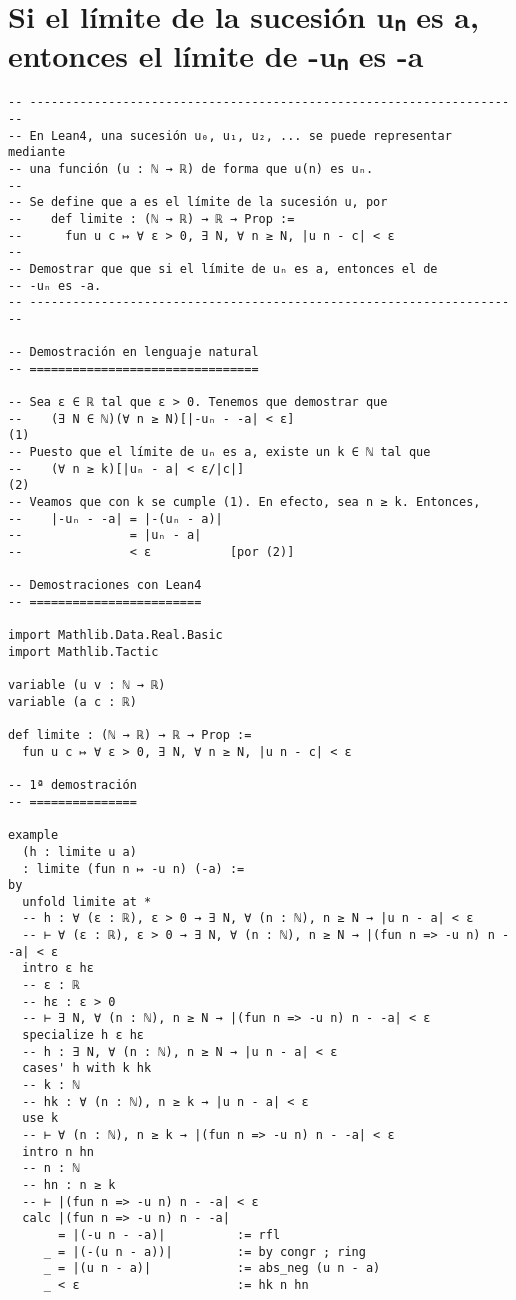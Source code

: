 \section{Si el límite de la sucesión uₙ es a, entonces el límite de -uₙ es -a}
\label{sec:orge0c8ccc}
\begin{verbatim}
-- ---------------------------------------------------------------------
-- En Lean4, una sucesión u₀, u₁, u₂, ... se puede representar mediante
-- una función (u : ℕ → ℝ) de forma que u(n) es uₙ.
--
-- Se define que a es el límite de la sucesión u, por
--    def limite : (ℕ → ℝ) → ℝ → Prop :=
--      fun u c ↦ ∀ ε > 0, ∃ N, ∀ n ≥ N, |u n - c| < ε
--
-- Demostrar que que si el límite de uₙ es a, entonces el de
-- -uₙ es -a.
-- ---------------------------------------------------------------------

-- Demostración en lenguaje natural
-- ================================

-- Sea ε ∈ ℝ tal que ε > 0. Tenemos que demostrar que
--    (∃ N ∈ ℕ)(∀ n ≥ N)[|-uₙ - -a| < ε]                             (1)
-- Puesto que el límite de uₙ es a, existe un k ∈ ℕ tal que
--    (∀ n ≥ k)[|uₙ - a| < ε/|c|]                                    (2)
-- Veamos que con k se cumple (1). En efecto, sea n ≥ k. Entonces,
--    |-uₙ - -a| = |-(uₙ - a)|
--               = |uₙ - a|
--               < ε           [por (2)]

-- Demostraciones con Lean4
-- ========================

import Mathlib.Data.Real.Basic
import Mathlib.Tactic

variable (u v : ℕ → ℝ)
variable (a c : ℝ)

def limite : (ℕ → ℝ) → ℝ → Prop :=
  fun u c ↦ ∀ ε > 0, ∃ N, ∀ n ≥ N, |u n - c| < ε

-- 1ª demostración
-- ===============

example
  (h : limite u a)
  : limite (fun n ↦ -u n) (-a) :=
by
  unfold limite at *
  -- h : ∀ (ε : ℝ), ε > 0 → ∃ N, ∀ (n : ℕ), n ≥ N → |u n - a| < ε
  -- ⊢ ∀ (ε : ℝ), ε > 0 → ∃ N, ∀ (n : ℕ), n ≥ N → |(fun n => -u n) n - -a| < ε
  intro ε hε
  -- ε : ℝ
  -- hε : ε > 0
  -- ⊢ ∃ N, ∀ (n : ℕ), n ≥ N → |(fun n => -u n) n - -a| < ε
  specialize h ε hε
  -- h : ∃ N, ∀ (n : ℕ), n ≥ N → |u n - a| < ε
  cases' h with k hk
  -- k : ℕ
  -- hk : ∀ (n : ℕ), n ≥ k → |u n - a| < ε
  use k
  -- ⊢ ∀ (n : ℕ), n ≥ k → |(fun n => -u n) n - -a| < ε
  intro n hn
  -- n : ℕ
  -- hn : n ≥ k
  -- ⊢ |(fun n => -u n) n - -a| < ε
  calc |(fun n => -u n) n - -a|
       = |(-u n - -a)|          := rfl
     _ = |(-(u n - a))|         := by congr ; ring
     _ = |(u n - a)|            := abs_neg (u n - a)
     _ < ε                      := hk n hn


\end{verbatim}
